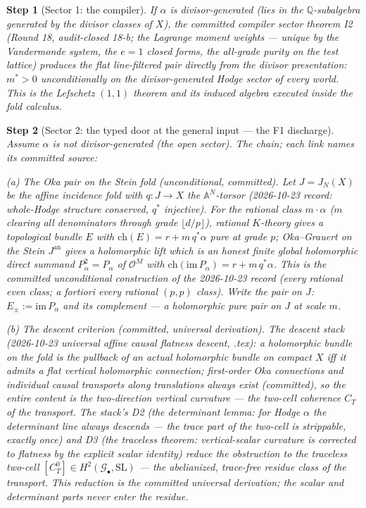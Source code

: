 \documentclass[11pt]{article}
\newtheorem{step}{Step}
\begin{document}
\begin{step}[Sector 1: the compiler]\label{step:compiler}
If $\alpha$ is divisor-generated (lies in the $\mathbb{Q}$-subalgebra
generated by the divisor classes of $X$), the committed compiler sector
theorem I2 (Round 18, audit-closed 18-b; the Lagrange moment weights ---
unique by the Vandermonde system, the $e = 1$ closed forms, the all-grade
purity on the test lattice) produces the flat line-filtered pair directly
from the divisor presentation: $m^* > 0$ \emph{unconditionally} on the
divisor-generated Hodge sector of \emph{every} world. This is the
Lefschetz $(1,1)$ theorem and its induced algebra executed inside the fold
calculus.
\end{step}

\begin{step}[Sector 2: the typed door at the general input --- the F1
discharge]\label{step:door}
Assume $\alpha$ is not divisor-generated (the open sector). The chain; each
link names its committed source:

\emph{(a) The Oka pair on the Stein fold (unconditional, committed).} Let
$J = J_N(X)$ be the affine incidence fold with $q: J \to X$ the
$\mathbb{A}^N$-torsor (2026-10-23 record: whole-Hodge structure conserved,
$q^*$ injective). For the rational class $m \cdot \alpha$ ($m$ clearing all
denominators through grade $\lfloor d/p \rfloor$), rational $K$-theory gives
a topological bundle $E$ with $\mathrm{ch}(E) = r + m\, q^*\alpha$ pure at
grade $p$; Oka--Grauert on the Stein $J^{\mathrm{an}}$ gives a holomorphic
lift which is an honest finite global holomorphic direct summand
$P_\alpha^2 = P_\alpha$ of $\mathcal{O}^M$ with
$\mathrm{ch}(\mathrm{im}\, P_\alpha) = r + m\, q^* \alpha$. This is the
committed unconditional construction of the 2026-10-23 record (every
rational even class; a fortiori every rational $(p,p)$ class). Write the
pair on $J$: $E_\pm := \mathrm{im}\, P_\alpha$ and its complement --- a
holomorphic pure pair on $J$ at scale $m$.

\emph{(b) The descent criterion (committed, universal derivation).} The
descent stack (2026-10-23 universal affine causal flatness descent,
.tex): a holomorphic bundle on the fold is the pullback of an actual
holomorphic bundle on compact $X$ iff it admits a flat vertical holomorphic
connection; first-order Oka connections and individual causal transports
along translations always exist (committed), so the entire content is the
\emph{two-direction vertical curvature} --- the two-cell coherence $C_T$ of
the transport. The stack's D2 (the determinant lemma: for Hodge $\alpha$ the
determinant line always descends --- the trace part of the two-cell is
strippable, exactly once) and D3 (the traceless theorem: vertical-scalar
curvature is corrected to flatness by the explicit scalar identity) reduce
the obstruction to the \emph{traceless two-cell}
$[C_T^0] \in H^2(\mathcal{G}_\bullet, \mathrm{SL})$ --- the abelianized,
trace-free residue class of the transport. This reduction is the committed
universal derivation; the scalar and determinant parts never enter the
residue.


\end{step}
\end{document}
